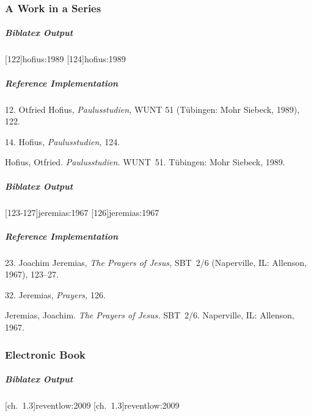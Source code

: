 \documentclass[a4paper]{article}
\newenvironment{biboutput}{%
  \subparagraph{Biblatex Output}
}{\color{black}}
\newenvironment{refimp}{%
  \subparagraph{Reference Implementation}
  \color{reference-colour}
  \rm
}{\par\color{black}}
\begin{document}
\subsubsection{A Work in a Series}

\begin{biboutput}
  [122]{hofius:1989}
  [124]{hofius:1989}
\end{biboutput}

\begin{refimp}
  \hspace*{\bibindent}12. Otfried Hofius, \emph{Paulusstudien,} WUNT 51
  (Tübingen: Mohr Siebeck, 1989), 122.

  \hspace*{\bibindent}14. Hofius, \emph{Paulusstudien,} 124.

  Hofius, Otfried. \emph{Paulusstudien.} WUNT~51. Tübingen: Mohr Siebeck,
  1989.
  
\end{refimp}

\begin{biboutput}
  [123-127]{jeremias:1967}
  [126]{jeremias:1967}
\end{biboutput}

\begin{refimp}
  \hspace*{\bibindent}23. Joachim Jeremias, \emph{The Prayers of Jesus,}
  SBT~2/6 (Naperville, IL: Allenson, 1967), 123–27. 

  \hspace*{\bibindent}32. Jeremias, \emph{Prayers,} 126.

  \hangindent\bibindent Jeremias, Joachim. \emph{The Prayers of Jesus.}
  SBT~2/6. Naperville, IL: Allenson, 1967.

\end{refimp}

\subsubsection{Electronic Book}

\begin{biboutput}
  [ch.~1.3]{reventlow:2009}
  [ch.~1.3]{reventlow:2009}
\end{biboutput}
\end{document}
